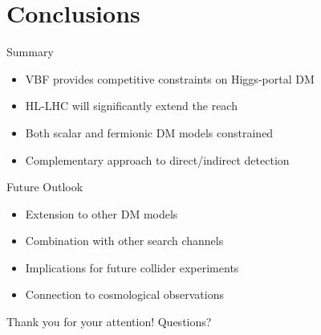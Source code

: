 \documentclass{../../bredelebeamer}
\begin{document}
\section{Conclusions}
\begin{frame}{Summary}
    \begin{itemize}
        \item VBF provides competitive constraints on Higgs-portal DM
        \item HL-LHC will significantly extend the reach
        \item Both scalar and fermionic DM models constrained
        \item Complementary approach to direct/indirect detection
    \end{itemize}
\end{frame}

\begin{frame}{Future Outlook}
    \begin{itemize}
        \item Extension to other DM models
        \item Combination with other search channels
        \item Implications for future collider experiments
        \item Connection to cosmological observations
    \end{itemize}
\end{frame}

\begin{frame}
    \centering
    \Huge Thank you for your attention!
    \vfill
    \Large Questions?
\end{frame}
\end{document}
